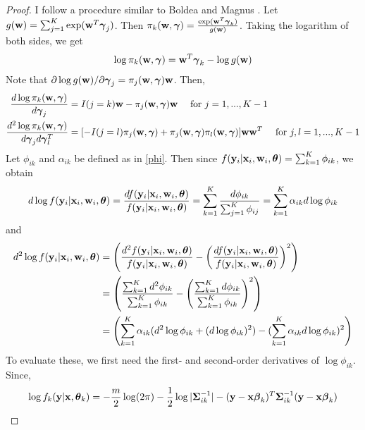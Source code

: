 \begin{proof}
I follow a procedure similar to Boldea and Magnus \cite{boldea2009}. Let $g(\mathbf  w)=\sum_{j=1}^{K}\exp(\mathbf  w^{T}\boldsymbol \gamma_{j})$. Then $\pi_{k}(\mathbf w,\boldsymbol\gamma)=\frac{\exp( \mathbf  w^{T}\boldsymbol\gamma_{k})}{g(\mathbf  w)}$. Taking the logarithm of both sides, we get
\begin{align}
\log \pi_{k}(\mathbf w,\boldsymbol\gamma)=\mathbf w^{T}\boldsymbol\gamma_{k} - \log g(\mathbf w)
\label{wts}
\end{align}
Note that $\partial\log g(\mathbf w)/\partial \boldsymbol \gamma_{j}=\pi_{j}(\mathbf w,\boldsymbol\gamma) \mathbf w$. Then,
\begin{align}
\frac{d\log\pi_{k}(\mathbf w,\boldsymbol\gamma)}{d\boldsymbol\gamma_{j}}&=I(j=k)\mathbf w-\pi_{j}(\mathbf w,\boldsymbol\gamma)\mathbf w\quad\text{ for }j=1,...,K-1\nonumber\\
\frac{d^{2}\log\pi_{k}(\mathbf w,\boldsymbol\gamma)}{d\boldsymbol\gamma_{j}d\boldsymbol\gamma_{l}^{T}}&=[-I(j=l)\pi_{j}(\mathbf w,\boldsymbol\gamma)+\pi_{j}(\mathbf w,\boldsymbol\gamma)\pi_{l}(\mathbf w,\boldsymbol\gamma)]\mathbf w\mathbf w^{T}\quad\text{ for }j,l=1,...,K-1
\label{logpi}
\end{align}
Let $\phi_{ik}$ and $\alpha_{ik}$ be defined as in \eqref{phi}. Then since $f(\mathbf y_{i}|\mathbf x_{i},\mathbf w_{i},\boldsymbol\theta)=\sum^{K}_{k=1}\phi_{ik}$, we obtain
\begin{align}
d\log f(\mathbf y_{i}|\mathbf x_{i},\mathbf w_{i},\boldsymbol\theta)=\frac{d f(\mathbf y_{i}|\mathbf x_{i},\mathbf w_{i},\boldsymbol\theta)}{f(\mathbf y_{i}|\mathbf x_{i},\mathbf w_{i},\boldsymbol\theta)}=\sum^{K}_{k=1}\frac{d\phi_{ik}}{\sum^{K}_{j=1}\phi_{ij}}=\sum^{K}_{k=1}\alpha_{ik}d\log \phi_{ik}\label{dlogf}
\end{align}
and 
\begin{align}\label{d2logf}
d^{2}\log f(\mathbf y_{i}|\mathbf x_{i},\mathbf w_{i},\boldsymbol\theta)&=\left(\frac{d^{2} f(\mathbf y_{i}|\mathbf x_{i},\mathbf w_{i},\boldsymbol\theta)}{f(\mathbf y_{i}|\mathbf x_{i},\mathbf w_{i},\boldsymbol\theta)}-\left(\frac{d f(\mathbf y_{i}|\mathbf x_{i},\mathbf w_{i},\boldsymbol\theta)}{f(\mathbf y_{i}|\mathbf x_{i},\mathbf w_{i},\boldsymbol\theta)}\right)^{2}\right)\nonumber\\
&=\left(\frac{\sum^{K}_{k=1}d^{2}\phi_{ik}}{\sum^{K}_{k=1}\phi_{ik}}-\left(\frac{\sum^{K}_{k=1}d \phi_{ik}}{\sum^{K}_{k=1}\phi_{ik}}\right)^{2}\right)\nonumber\\
&=\left(\sum^{K}_{k=1}\alpha_{ik}(d^{2}\log \phi_{ik}+(d\log \phi_{ik})^{2})-(\sum^{K}_{k=1}\alpha_{ik}d\log \phi_{ik})^{2}\right)
\end{align}
To evaluate these, we first need the first- and second-order derivatives of $\log \phi_{ik}$.  Since, 
\begin{align*}
\log f_{k}(\B y|\B x,\BS\theta_{k})=-\frac{m}{2}\log(2\pi)-\frac{1}{2}\log |\BS\Sigma_{ik}^{-1}|-(\B y-\B x\BS \beta_{k})^{T}\BS\Sigma_{ik}^{-1}(\B y-\B x\BS\beta_{k})

\end{align*}
\end{proof}
